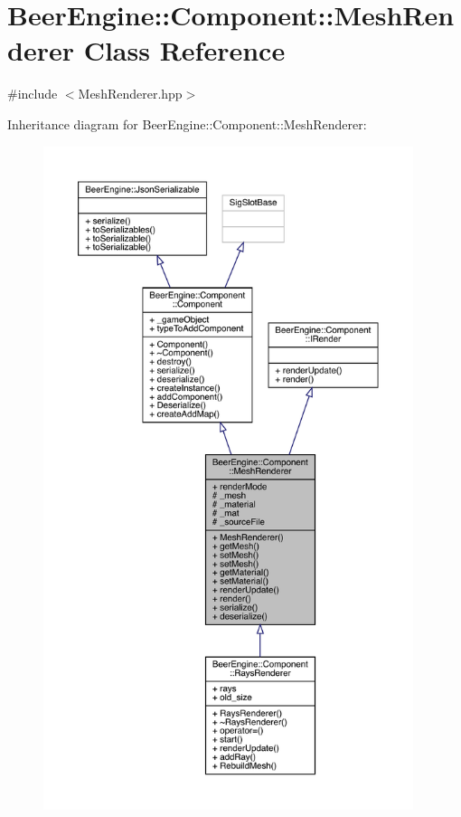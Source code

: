 \hypertarget{class_beer_engine_1_1_component_1_1_mesh_renderer}{}\section{Beer\+Engine\+:\+:Component\+:\+:Mesh\+Renderer Class Reference}
\label{class_beer_engine_1_1_component_1_1_mesh_renderer}


{\ttfamily \#include $<$Mesh\+Renderer.\+hpp$>$}



Inheritance diagram for Beer\+Engine\+:\+:Component\+:\+:Mesh\+Renderer\+:\nopagebreak
\begin{figure}[H]
\begin{center}
\leavevmode
\includegraphics[height=550pt]{class_beer_engine_1_1_component_1_1_mesh_renderer__inherit__graph}
\end{center}
\end{figure}


